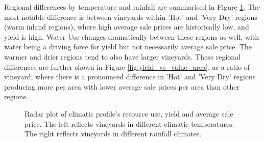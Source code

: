 \documentclass[review,12pt,authoryear]{elsarticle}
\begin{document}
\begin{linenumbers}
%
%
%
%
%
%
%
%
%

Regional differences by temperature and rainfall are summarised in Figure \ref{fig:spider}. The most notable difference is between vineyards within 'Hot' and 'Very Dry' regions (warm inland regions), where high average sale prices are historically low, and yield is high. Water Use changes dramatically between these regions as well, with water being a driving force for yield but not necessarily average sale price. The warmer and drier regions tend to also have larger vineyards. These regional differences are further shown in Figure \ref{fig:yield_vs_value_area}, as a ratio of vineyard; where there is a pronounced difference in 'Hot' and 'Very Dry' regions producing more per area with lower average sale prices per area than other regions.
\par
\begin{figure}
  \caption{Radar plot of climatic profile's resource use, yield and average sale price. The left reflects vineyards in different climatic temperatures. The right reflects vineyards in different rainfall climates.}\label{fig:spider}
\end{figure}


\end{linenumbers}
\end{document}
